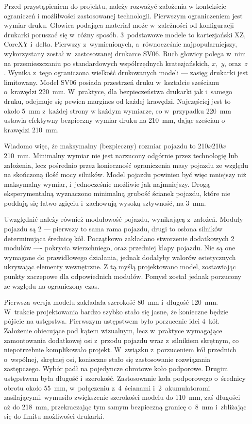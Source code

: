Przed przystąpieniem do projektu, należy rozważyć założenia w kontekście ograniczeń i możlilwości zastosowanej technologii. Pierwszym ograniczeniem jest wymiar druku. Głowica podająca materiał może w~zależności od konfiguracji drukarki poruszać się w~różny sposób. 3~podstawowe modele to kartezjański XZ, CoreXY i~delta. Pierwszy z~wymienionych, a~równocześnie najpopularniejszy, wykorzystany został w~zastosowanej drukarce SV06. Ruch głowicy polega w~nim na przemieszczaniu po standardowych współrzędnych kratezjańskich, $x$,~$y$, oraz~$z$. Wynika z~tego ograniczona wielkość drukowanych modeli --- zasięg drukarki jest limitowany. Model SV06 posiada przestrzeń druku w~kształcie sześcianu o~krawędzi 220~mm. W~praktyce, dla bezpieczeństwa drukarki jak i~samego druku, odejmuje się pewien margines od każdej krawędzi. Najczęściej jest to około 5~mm z~każdej strony w każdym wymiarze, co w~przypadku 220~mm ustawia efektywny bezpieczny wymiar druku na 210~mm, dając sześcian o krawędzi 210~mm.

Wiadomo więc, że maksymalny (bezpieczny) rozmiar pojazdu to 210$x$210$x$210~mm. Minimalny wymiar nie jest narzucony odgórnie przez technologię lub założenia, lecz pośrednio przez konieczność ograniczenia masy pojazdu ze względu na skończoną ilość mocy silników. Model pojazdu powinien być więc mniejszy niż maksymalny wymiar, i~jednocześnie możliwie jak najmniejszy. Drogą eksperymentalną wyznaczono minimalną grubość ścianek pojazdu, które nie poddają się łatwo zgięciu i~zachowują wysoką sztywność, na 3~mm.

Uwzględnić należy również modułowość pojazdu, wynikającą z~założeń. Moduły pojazdu są 2 --- pierwszy to sama rama pojazdu, drugi to osłona silników determinująca średnicę kół. Początkowo zakładano stworzenie dodatkowych 2 modułów ---- pokrycia wierzchniego, oraz przedniej klapy pojazdu. Nie są one wymagane do prawidłowego działania, jednak dodałyby walorów estetycznych ukrywając elementy wewnętrzne. Z tą myślą projektowano model, zostawiając punkty zaczepowe dla odpowiednich modułów. Pomysł został jednak porzucony ze względu na ograniczony czas.

Pierwsza wersja modelu zakładała szerokość 80~mm i~długość 120~mm. W~trakcie projektowania bardzo szybko stało się jasne, że konieczne będzie pójście na ustępstwa. Pierwszym ustępstwem było porzucenie idei 4~kół. Założenie obiecujące pod kątem wizualnym, lecz w~praktyce wymagające zamontowania dodatkowej osi z~przodu pojazdu wraz z~silnikiem skrętnym, co niepotrzebnie komplikowało projekt. W~związku z~porzuceniem kół przednich o~wspólnej, skrętnej osi, konieczne stało się zastosowanie rozwiązania zastępczego. Wybór padł na pojedyncze obrotowe koło podporowe. Drugim ustępstwem była długość i~szerokość. Zastosowanie koła podporowego o~średnicy obrotu około 55~mm, w~połączeniu z~4~ścianami i~2~akumulatorami zasilającymi, wymusiło zwiększenie szerokości modelu do 110~mm, zaś długości aż do 218~mm, przekraczając tym samym bezpieczną granicę o~8~mm i~zbliżając się do limitu możliwości drukarki.

